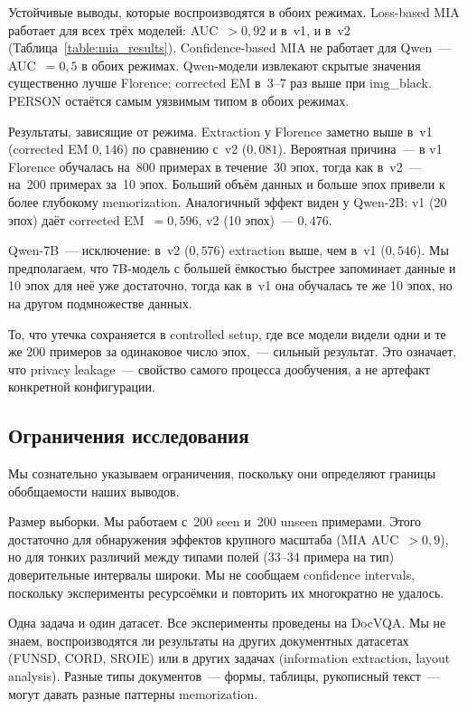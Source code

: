 \documentclass[a4paper,12pt]{extarticle}
\begin{document}
Устойчивые выводы, которые воспроизводятся в обоих режимах. Loss-based MIA работает для всех трёх моделей: AUC~$> 0{,}92$ и в~v1, и в~v2 (Таблица~\ref{table:mia_results}). Confidence-based MIA не работает для Qwen~--- AUC~$= 0{,}5$ в обоих режимах. Qwen-модели извлекают скрытые значения существенно лучше Florence: corrected EM в~3--7 раз выше при img\_black. PERSON остаётся самым уязвимым типом в обоих режимах.

Результаты, зависящие от режима. Extraction у Florence заметно выше в~v1 (corrected EM $0{,}146$) по сравнению с~v2 ($0{,}081$). Вероятная причина~--- в v1 Florence обучалась на~800 примерах в течение~30 эпох, тогда как в~v2~--- на~200 примерах за~10 эпох. Больший объём данных и больше эпох привели к более глубокому memorization. Аналогичный эффект виден у Qwen-2B: v1 (20 эпох) даёт corrected EM~$= 0{,}596$, v2 (10 эпох)~--- $0{,}476$.

Qwen-7B~--- исключение: в~v2 ($0{,}576$) extraction выше, чем в~v1 ($0{,}546$). Мы предполагаем, что 7B-модель с большей ёмкостью быстрее запоминает данные и 10 эпох для неё уже достаточно, тогда как в~v1 она обучалась те же 10 эпох, но на другом подмножестве данных.

То, что утечка сохраняется в controlled setup, где все модели видели одни и те же 200 примеров за одинаковое число эпох,~--- сильный результат. Это означает, что privacy leakage~--- свойство самого процесса дообучения, а не артефакт конкретной конфигурации.

\subsection{Ограничения исследования}
\label{sec:discussion_limitations}

Мы сознательно указываем ограничения, поскольку они определяют границы обобщаемости наших выводов.

Размер выборки. Мы работаем с~200 seen и~200 unseen примерами. Этого достаточно для обнаружения эффектов крупного масштаба (MIA AUC~$> 0{,}9$), но для тонких различий между типами полей (33--34 примера на тип) доверительные интервалы широки. Мы не сообщаем confidence intervals, поскольку эксперименты ресурсоёмки и повторить их многократно не удалось.

Одна задача и один датасет. Все эксперименты проведены на DocVQA. Мы не знаем, воспроизводятся ли результаты на других документных датасетах (FUNSD, CORD, SROIE) или в других задачах (information extraction, layout analysis). Разные типы документов~--- формы, таблицы, рукописный текст~--- могут давать разные паттерны memorization.
\end{document}
